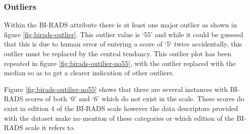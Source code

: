 \documentclass[12pt]{article}
\begin{document}
      \subsubsection{Outliers}
        Within the BI-RADS attribute there is at least one major outlier as shown in figure \ref{fig:birads-outlier}. This outlier value is ‘55’ and while it could be guessed that this is due to human error of entering a score of ‘5‘ twice accidentally, this outlier must be replaced by the central tendancy. This outlier plot has been repeated in figure \ref{fig:birads-outilier-no55}, with the outlier replaced with the median so as to get a clearer indication of other outliers.

        Figure \ref{fig:birads-outilier-no55} shows that there are several instances with BI-RADS scores of both ‘0’ and ‘6’ which do not exist in the scale. These scores do exist in edition 4 of the BI-RADS scale \citep{d2003breast} however the data descriptors provided with the dataset make no mention of these categories or which edition of the BI-RADS scale it refers to.
\end{document}
